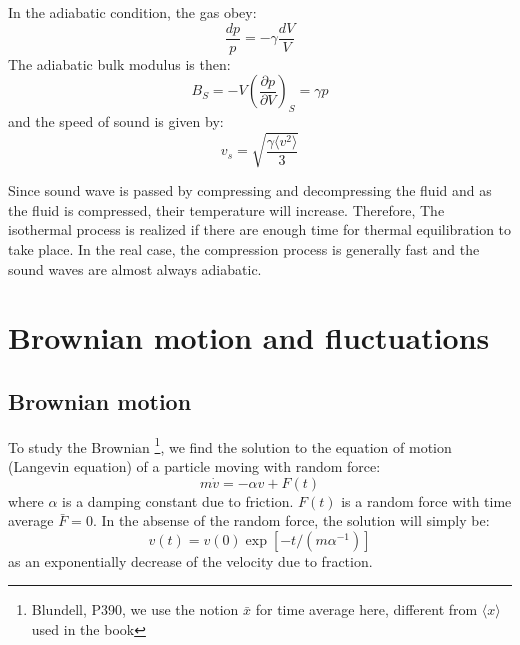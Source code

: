 \documentclass{article}
\newcommand{\pfrac}[2]{\frac{\partial #1}{\partial #2}}
\begin{document}
In the adiabatic condition, the gas obey:
\begin{equation}
    \frac{dp}{p} = -\gamma \frac{dV}{V}
\end{equation}
The adiabatic bulk modulus is then:
\begin{equation}
    B_S = -V \left( \pfrac{p}{V} \right)_S = \gamma p
\end{equation}
and the speed of sound is given by:
\begin{equation}
    v_s = \sqrt{\frac{\gamma\langle v^2 \rangle }{3}}    
\end{equation}

Since sound wave is passed by compressing and decompressing the fluid and as the fluid is compressed, their 
temperature will increase. Therefore,
The isothermal process is realized if there are enough time for thermal equilibration to take place.  
In the real case, the compression process is generally fast and the sound waves are almost always adiabatic.

\section{Brownian motion and fluctuations}
\subsection{Brownian motion}
To study the Brownian
\footnote{Blundell, P390, we use the notion $\bar{x}$ for time average here, 
different from $\langle x \rangle$ used in the book}, 
we find the solution to the equation of motion (Langevin equation)
of a particle moving with random force:
\begin{equation}
    m\dot{v} = -\alpha v + F(t) \label{brownian_eom}
\end{equation}
where $\alpha$ is a damping constant due to friction. $F(t)$ is a random force with 
time average $\bar{F} = 0$.
In the absense of the random force, the solution will simply be:
\begin{equation}
    v(t) = v(0)\exp[-t/(m\alpha^{-1})]
\end{equation}
as an exponentially decrease of the velocity due to fraction.
\end{document}
